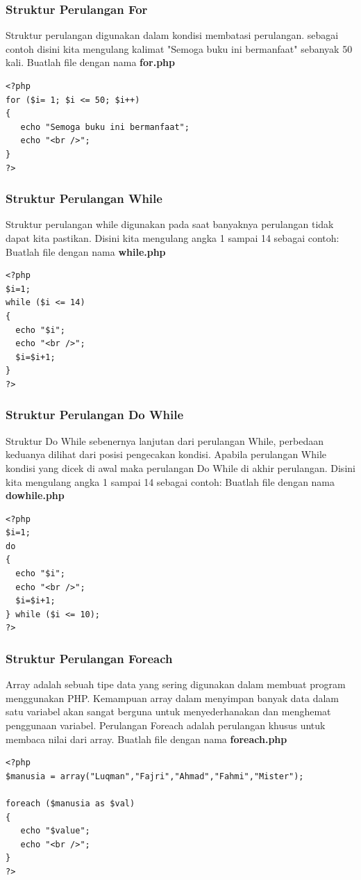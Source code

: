 \subsubsection{Struktur Perulangan For}
Struktur perulangan digunakan dalam kondisi membatasi perulangan. sebagai contoh disini kita mengulang kalimat "Semoga buku ini bermanfaat" sebanyak 50 kali. Buatlah file dengan nama \textbf{for.php}
\begin{lstlisting}
<?php
for ($i= 1; $i <= 50; $i++)
{
   echo "Semoga buku ini bermanfaat";
   echo "<br />";
}
?>
\end{lstlisting}

\subsubsection{Struktur Perulangan While}
Struktur perulangan while digunakan pada saat banyaknya perulangan tidak dapat kita pastikan.
Disini kita mengulang angka  1 sampai 14 sebagai contoh:  Buatlah file dengan nama \textbf{while.php}
\begin{lstlisting}
<?php
$i=1;
while ($i <= 14)
{
  echo "$i";
  echo "<br />";
  $i=$i+1;
}
?>
\end{lstlisting}

\subsubsection{Struktur Perulangan Do While}
Struktur Do While sebenernya lanjutan dari perulangan While, perbedaan keduanya dilihat dari posisi pengecakan kondisi. Apabila perulangan While kondisi yang dicek di awal maka perulangan Do While di akhir perulangan. Disini kita mengulang angka  1 sampai 14 sebagai contoh:  Buatlah file dengan nama \textbf{dowhile.php}
\begin{lstlisting}
<?php
$i=1;
do
{
  echo "$i";
  echo "<br />";
  $i=$i+1;
} while ($i <= 10);
?>
\end{lstlisting}

\subsubsection{Struktur Perulangan Foreach}
Array adalah sebuah tipe data yang sering digunakan dalam membuat program menggunakan PHP. Kemampuan array dalam menyimpan banyak data dalam satu variabel akan sangat berguna untuk menyederhanakan dan menghemat penggunaan variabel. Perulangan Foreach adalah perulangan khusus untuk membaca nilai dari array. Buatlah file dengan nama \textbf{foreach.php}
\begin{lstlisting}
<?php
$manusia = array("Luqman","Fajri","Ahmad","Fahmi","Mister");

foreach ($manusia as $val)
{
   echo "$value";
   echo "<br />";
}
?>
\end{lstlisting}

